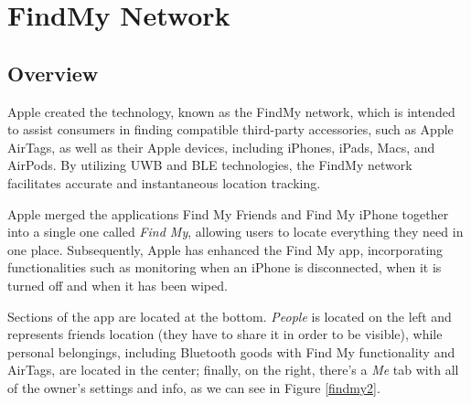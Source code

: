 \documentclass[english]{article}
\begin{document}
\section{FindMy Network}\label{sec:find}
\subsection{Overview}
Apple created the technology, known as the FindMy network, which is intended to assist consumers in finding compatible third-party accessories, such as Apple AirTags, as well as their Apple devices, including iPhones, iPads, Macs, and AirPods. By utilizing UWB and BLE technologies, the FindMy network facilitates accurate and instantaneous location tracking.

Apple merged the applications Find My Friends and Find My iPhone together into a single one called \textit{Find My}, allowing users to locate everything they need in one place. Subsequently, Apple has enhanced the Find My app, incorporating functionalities such as monitoring when an iPhone is disconnected, when it is turned off and when it has been wiped.

Sections of the app are located at the bottom. \textit{People} is located on the left and represents friends location (they have to share it in order to be visible), while personal belongings, including Bluetooth goods with Find My functionality and AirTags, are located in the center; finally, on the right, there's a \textit{Me} tab with all of the owner's settings and info, as we can see in Figure \ref{findmy2}.
\end{document}
